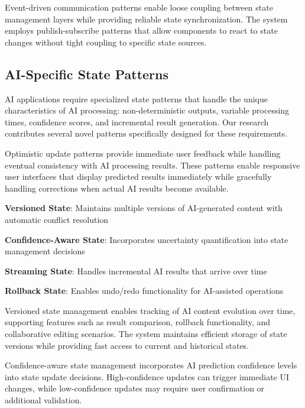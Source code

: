 Event-driven communication patterns enable loose coupling between state management layers while providing reliable state synchronization. The system employs publish-subscribe patterns that allow components to react to state changes without tight coupling to specific state sources.

\subsection*{AI-Specific State Patterns}

AI applications require specialized state patterns that handle the unique characteristics of AI processing: non-deterministic outputs, variable processing times, confidence scores, and incremental result generation. Our research contributes several novel patterns specifically designed for these requirements.

Optimistic update patterns provide immediate user feedback while handling eventual consistency with AI processing results. These patterns enable responsive user interfaces that display predicted results immediately while gracefully handling corrections when actual AI results become available.

\begin{expandedlist}
    \item \textbf{Versioned State}: Maintains multiple versions of AI-generated content with automatic conflict resolution
    \item \textbf{Confidence-Aware State}: Incorporates uncertainty quantification into state management decisions
    \item \textbf{Streaming State}: Handles incremental AI results that arrive over time
    \item \textbf{Rollback State}: Enables undo/redo functionality for AI-assisted operations
\end{expandedlist}

Versioned state management enables tracking of AI content evolution over time, supporting features such as result comparison, rollback functionality, and collaborative editing scenarios. The system maintains efficient storage of state versions while providing fast access to current and historical states.

Confidence-aware state management incorporates AI prediction confidence levels into state update decisions. High-confidence updates can trigger immediate UI changes, while low-confidence updates may require user confirmation or additional validation.

